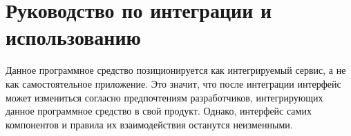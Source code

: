 \section{Руководство по интеграции и использованию}
\label{sec:manual}

Данное программное средство позиционируется как интегрируемый сервис, а не как самостоятельное приложение. Это значит, что после интеграции интерфейс может измениться согласно предпочтениям разработчиков, интегрирующих данное программное средство в свой продукт. Однако, интерфейс самих компонентов и правила их взаимодействия останутся неизменными.




\pagebreak


